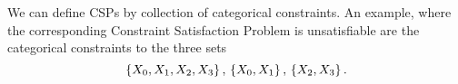 \begin{remark}
    We can define CSPs by collection of categorical constraints.
    An example, where the corresponding Constraint Satisfaction Problem is unsatisfiable are the categorical constraints to the three sets
    \[ \{X_{0},X_{1},X_{2},X_{3}\} \, , \, \{X_{0},X_{1}\}\, ,\,\{X_{2},X_{3}\} \, . \]
\end{remark}


